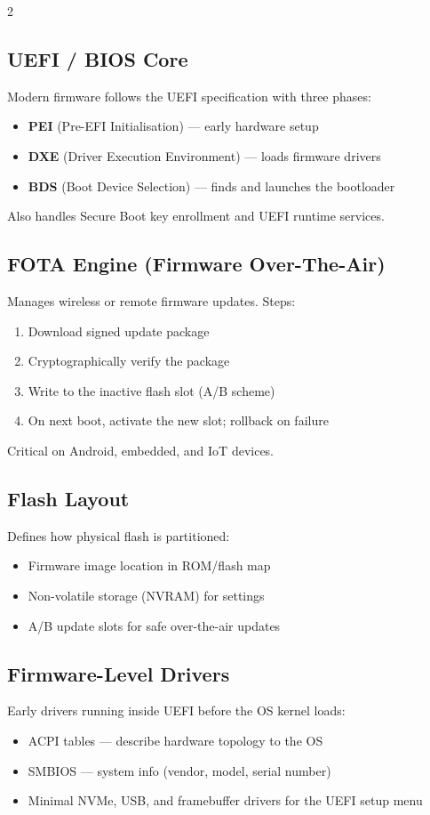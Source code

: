 2\documentclass[11pt,a4paper]{article}
\begin{document}
\subsection{UEFI / BIOS Core}
Modern firmware follows the UEFI specification with three phases:
\begin{itemize}[noitemsep]
  \item \textbf{PEI} (Pre-EFI Initialisation) --- early hardware setup
  \item \textbf{DXE} (Driver Execution Environment) --- loads firmware drivers
  \item \textbf{BDS} (Boot Device Selection) --- finds and launches the bootloader
\end{itemize}
Also handles Secure Boot key enrollment and UEFI runtime services.

\subsection{FOTA Engine (Firmware Over-The-Air)}
Manages wireless or remote firmware updates. Steps:
\begin{enumerate}[noitemsep]
  \item Download signed update package
  \item Cryptographically verify the package
  \item Write to the inactive flash slot (A/B scheme)
  \item On next boot, activate the new slot; rollback on failure
\end{enumerate}
Critical on Android, embedded, and IoT devices.

\subsection{Flash Layout}
Defines how physical flash is partitioned:
\begin{itemize}[noitemsep]
  \item Firmware image location in ROM/flash map
  \item Non-volatile storage (NVRAM) for settings
  \item A/B update slots for safe over-the-air updates
\end{itemize}

\subsection{Firmware-Level Drivers}
Early drivers running inside UEFI before the OS kernel loads:
\begin{itemize}[noitemsep]
  \item ACPI tables --- describe hardware topology to the OS
  \item SMBIOS --- system info (vendor, model, serial number)
  \item Minimal NVMe, USB, and framebuffer drivers for the UEFI setup menu
\end{itemize}
\end{document}
